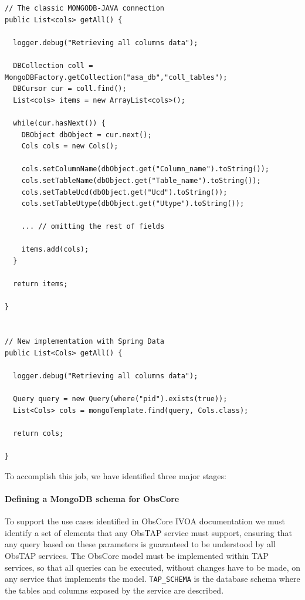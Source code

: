 \begin{lstlisting}[float,label=lst:classic_new,caption=Old vs new syntax Mongo-Java connection.]
// The classic MONGODB-JAVA connection
public List<cols> getAll() {
  
  logger.debug("Retrieving all columns data");

  DBCollection coll = MongoDBFactory.getCollection("asa_db","coll_tables");
  DBCursor cur = coll.find();
  List<cols> items = new ArrayList<cols>();

  while(cur.hasNext()) {
    DBObject dbObject = cur.next();
    Cols cols = new Cols();

    cols.setColumnName(dbObject.get("Column_name").toString());
    cols.setTableName(dbObject.get("Table_name").toString());
    cols.setTableUcd(dbObject.get("Ucd").toString());
    cols.setTableUtype(dbObject.get("Utype").toString());
    
    ... // omitting the rest of fields

    items.add(cols);
  }

  return items;

}


// New implementation with Spring Data
public List<Cols> getAll() {

  logger.debug("Retrieving all columns data");

  Query query = new Query(where("pid").exists(true));
  List<Cols> cols = mongoTemplate.find(query, Cols.class);

  return cols;

}
\end{lstlisting}

To accomplish this job, we have identified three major stages:

\paragraph*{Defining a MongoDB schema for ObsCore}
\label{sec:mongodb_obscore}
To support the use cases identified in ObsCore IVOA documentation  we must identify a set of elements that any ObsTAP service must support, ensuring that any query based on these parameters is guaranteed to be understood by all ObsTAP services.
The ObsCore model must be implemented within TAP services, so that all queries can be executed, without changes have to be made, on any service that implements the model.
\texttt{TAP\_SCHEMA} is the database schema where the tables and columns exposed by the service are described.



